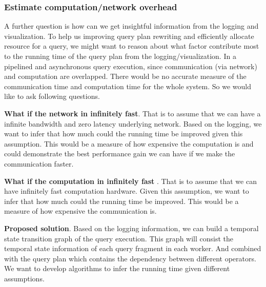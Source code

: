 \documentclass[11pt]{article}
\begin{document}
\subsubsection{Estimate computation/network overhead}
\label{sec:overhead}

A further question is  how can we get insightful information from the logging and visualization. To help us improving query plan rewriting and efficiently allocate resource for a query, we might want to reason about what factor contribute most to the running time of the query plan from the logging/visualization. In a pipelined and asynchronous query execution, since communication (via network) and computation are overlapped. There would be no accurate measure of the communication time and computation time for the whole system.  So we would like to ask following questions.

\noindent\textbf{What if the network in infinitely fast}.  That is to assume that we can have a infinite bandwidth and zero latency underlying network. Based on the logging, we want to infer that how much could the running time be improved given this assumption. This would be a measure of how expensive the computation is and could demonstrate the best performance gain we can have if we make the communication faster. 

\noindent\textbf{What if the computation in infinitely fast }.  That is to assume that we can have infinitely fast computation hardware. Given this assumption, we want to infer that how much could the running time be improved. This would be a measure of how expensive the communication is.

\noindent\textbf{Proposed solution}.  Based on the logging information, we can build a temporal state transition graph of the query execution. This graph will consist the temporal state information of each query fragment in each worker. And combined with the query plan which contains the dependency between different operators. We want to develop algorithms to infer the running time given different assumptions.
\end{document}
